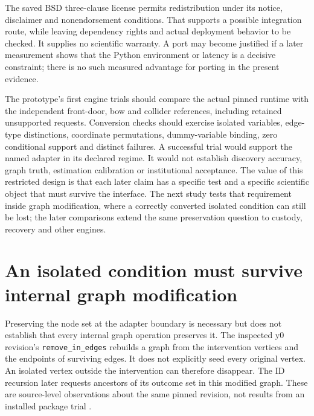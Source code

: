 The saved BSD three-clause license permits redistribution under its
notice, disclaimer and nonendorsement conditions. That supports a
possible integration route, while leaving dependency rights and actual
deployment behavior to be checked. It supplies no scientific warranty. A
port may become justified if a later measurement shows that the Python
environment or latency is a decisive constraint; there is no such
measured advantage for porting in the present evidence.
\citep{exec13_y0_license}

The prototype's first engine trials should compare the actual pinned
runtime with the independent front-door, bow and collider references,
including retained unsupported requests. Conversion checks should
exercise isolated variables, edge-type distinctions, coordinate
permutations, dummy-variable binding, zero conditional support and
distinct failures. A successful trial would support the named adapter in
its declared regime. It would not establish discovery accuracy, graph
truth, estimation calibration or institutional acceptance. The value of
this restricted design is that each later claim has a specific test and
a specific scientific object that must survive the interface. The next study tests that requirement inside graph modification, where a correctly converted isolated condition can still be lost; the later comparisons extend the same preservation question to custody, recovery and other engines.
\label{exec13:python-identification-end}

\label{exec13:interchange-end}


\section{An isolated condition must survive internal graph modification}
\label{exec13:isolated-condition}

Preserving the node set at the adapter boundary is necessary but does not
establish that every internal graph operation preserves it. The inspected y0
revision's \texttt{remove\_in\_edges} rebuilds a graph from the intervention
vertices and the endpoints of surviving edges. It does not explicitly seed
every original vertex. An isolated vertex outside the intervention can
therefore disappear. The ID recursion later requests ancestors of its outcome
set in this modified graph. These are source-level observations about the
same pinned revision, not results from an installed package trial
\citep{exec13_y0_graph,exec13_y0_id}.

